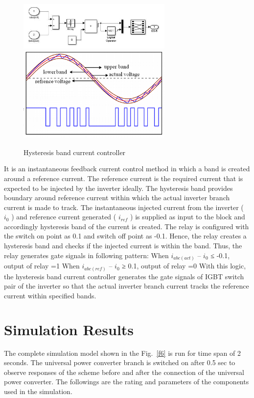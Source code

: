 \documentclass[journal,twoside]{IEEEtran}
\begin{document}
\begin{figure}[!ht]
\centering
\includegraphics[width=3in]{9}
\includegraphics[width=3in]{99}
\caption{Hysteresis band current controller}
\label{f9}
\end{figure}

\bigskip
It is an instantaneous feedback current control method in
which a band is created around a reference current. The
reference current is the required current that is expected to be
injected by the inverter ideally. The hysteresis band provides
boundary around reference current within which the actual
inverter branch current is made to track. The instantaneous
injected current from the inverter ( $i_0$ ) and reference current
generated ( $i_{ref}$ ) is supplied as input to the block and accordingly
hysteresis band of the current is created. The relay is
configured with the switch on point as 0.1 and switch off point
as -0.1. Hence, the relay creates a hysteresis band and checks if
the injected current is within the band. Thus, the relay
generates gate signals in following pattern:
When $i_{abc(act)}$ – $i_0$ ≤ -0.1, output of relay =1
When $i_{abc(ref)}$ – $i_0$ ≥ 0.1, output of relay =0
With this logic, the hysteresis band current controller generates
the gate signals of IGBT switch pair of the inverter so that the actual inverter branch current tracks the reference current
within specified bands.

\section{Simulation Results}
The complete simulation model shown in the Fig.~\ref{f6} is run for
time span of 2 seconds. The universal power converter branch
is switched on after 0.5 sec to observe responses of the scheme
before and after the connection of the universal power
converter. The followings are the rating and parameters of the
components used in the simulation.
\end{document}
